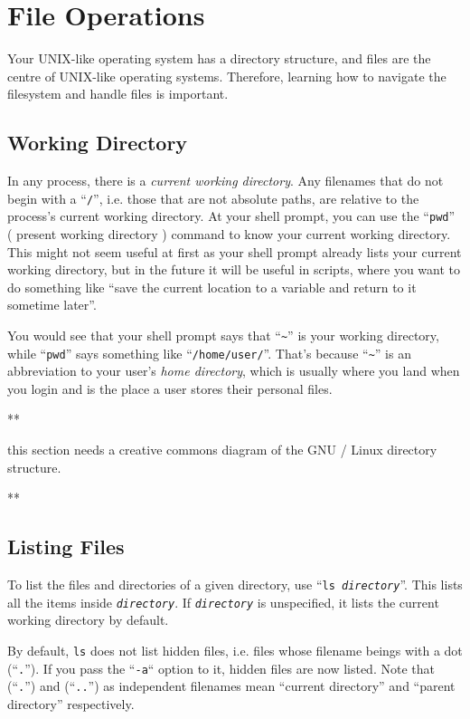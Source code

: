 \documentclass{extbook}
\newcommand\ph[1]{\texttt{\textit{#1}}}
\begin{document}
\section{File Operations}

Your UNIX-like operating system has a directory structure, and files are the centre of UNIX-like operating systems. Therefore, learning how to navigate the filesystem and handle files is important.

\subsection{Working Directory}

In any process, there is a \textit{current working directory}. Any filenames that do not begin with a ``\verb|/|'', i.e. those that are not absolute paths, are relative to the process's current working directory. At your shell prompt, you can use the ``\verb|pwd|'' ( present working directory ) command to know your current working directory. This might not seem useful at first as your shell prompt already lists your current working directory, but in the future it will be useful in scripts, where you want to do something like ``save the current location to a variable and return to it sometime later''.

You would see that your shell prompt says that ``\verb|~|'' is your working directory, while ``\verb|pwd|'' says something like ``\verb|/home/user/|''. That's because ``\verb|~|'' is an abbreviation to your user's \textit{home directory}, which is usually where you land when you login and is the place a user stores their personal files.

**

this section needs a creative commons diagram of the GNU / Linux directory structure.

**

\subsection{Listing Files}

To list the files and directories of a given directory, use ``\texttt{ls \ph{directory}}''. This lists all the items inside \ph{directory}. If \ph{directory} is unspecified, it lists the current working directory by default.

By default, \verb|ls| does not list hidden files, i.e. files whose filename beings with a dot (``\verb|.|''). If you pass the ``\verb|-a|`` option to it, hidden files are now listed. Note that (``\verb|.|'') and (``\verb|..|'') as independent filenames mean ``current directory'' and ``parent directory'' respectively.
\end{document}
